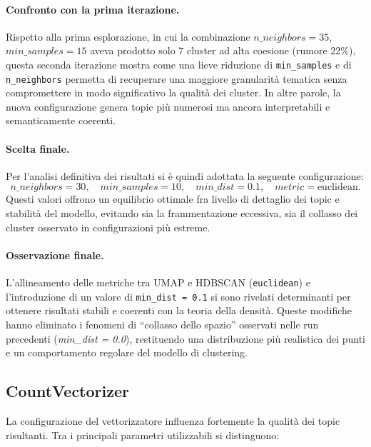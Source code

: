 \paragraph{Confronto con la prima iterazione.}
Rispetto alla prima esplorazione, in cui la combinazione
$n\_neighbors = 35$, $min\_samples = 15$ aveva prodotto solo $7$ cluster
ad alta coesione (rumore 22\%),
questa seconda iterazione mostra come una lieve riduzione di
\texttt{min\_samples} e di \texttt{n\_neighbors} permetta di recuperare
una maggiore granularità tematica senza compromettere in modo significativo
la qualità dei cluster.
In altre parole, la nuova configurazione genera topic più numerosi
ma ancora interpretabili e semanticamente coerenti.

\paragraph{Scelta finale.}
Per l’analisi definitiva dei risultati si è quindi adottata la seguente configurazione:
\[
\boxed{
n\_neighbors = 30, \quad min\_samples = 10, \quad min\_dist = 0.1, \quad metric = \text{euclidean}.
}
\]
Questi valori offrono un equilibrio ottimale fra livello di dettaglio dei topic
e stabilità del modello, evitando sia la frammentazione eccessiva,
sia il collasso dei cluster osservato in configurazioni più estreme.

\paragraph{Osservazione finale.}
L’allineamento delle metriche tra UMAP e HDBSCAN (\texttt{euclidean}) e l’introduzione di un valore di \texttt{min\_dist = 0.1}
si sono rivelati determinanti per ottenere risultati stabili e coerenti con la teoria della densità.
Queste modifiche hanno eliminato i fenomeni di ``collasso dello spazio'' osservati nelle run precedenti
(\emph{min\_dist = 0.0}), restituendo una distribuzione più realistica dei punti e un comportamento regolare
del modello di clustering.

\subsection{CountVectorizer}

\noindent La configurazione del vettorizzatore influenza fortemente la qualità dei topic risultanti. 
Tra i principali parametri utilizzabili si distinguono:

